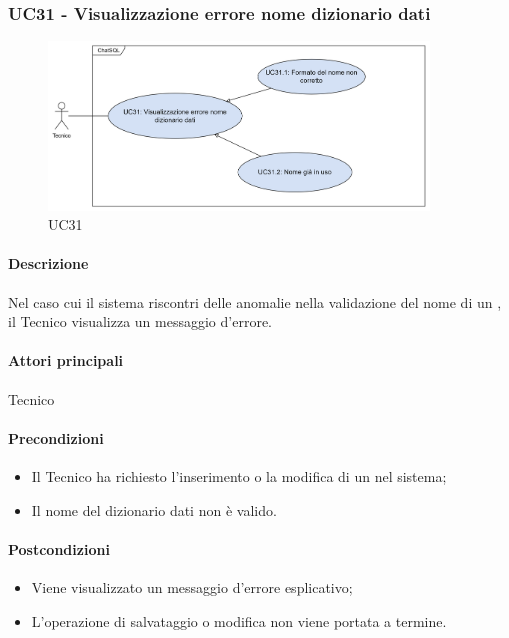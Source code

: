 \subsubsection{UC31 - Visualizzazione errore nome dizionario dati}\label{UC31}

\begin{figure}[H]
  \centering
  \includegraphics[width=0.90\textwidth]{assets/uc31.png}
  \caption{UC31}
\end{figure}

\paragraph*{Descrizione}
Nel caso cui il sistema riscontri delle anomalie nella validazione del nome di un , il Tecnico visualizza un messaggio d'errore.

\paragraph*{Attori principali}
Tecnico

\paragraph*{Precondizioni}
\begin{itemize}
  \item Il Tecnico ha richiesto l'inserimento o la modifica di un  nel sistema;
  \item Il nome del dizionario dati non è valido.
\end{itemize}

\paragraph*{Postcondizioni}
\begin{itemize}
  \item Viene visualizzato un messaggio d'errore esplicativo;
  \item L'operazione di salvataggio o modifica non viene portata a termine.
\end{itemize}

